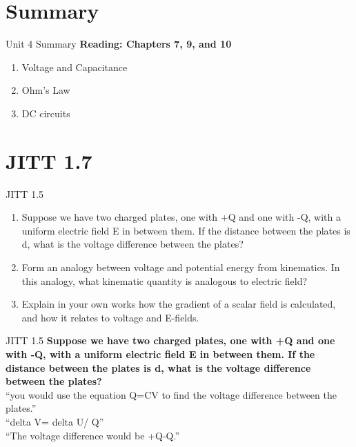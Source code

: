 \documentclass{beamer}
\begin{document}
\section{Summary}

\begin{frame}{Unit 4 Summary}
\textbf{Reading: Chapters 7, 9, and 10}
\begin{enumerate}
\item \alert{Voltage and Capacitance}
\item Ohm's Law
\item DC circuits
\end{enumerate}
\end{frame}

\section{JITT 1.7}

\begin{frame}{JITT 1.5}
\begin{enumerate}
\item Suppose we have two charged plates, one with +Q and one with -Q, with a uniform electric field E in between them.  If the distance between the plates is d, what is the voltage difference between the plates?
\item Form an analogy between voltage and potential energy from kinematics.  In this analogy, what kinematic quantity is analogous to electric field?
\item Explain in your own works how the \alert{gradient} of a \alert{scalar field} is calculated, and how it relates to voltage and E-fields.
\end{enumerate}
\end{frame}

\begin{frame}{JITT 1.5}
\textbf{Suppose we have two charged plates, one with +Q and one with -Q, with a uniform electric field E in between them.  If the distance between the plates is d, what is the voltage difference between the plates?} \\
``you would use the equation Q=CV to find the voltage difference between the plates.'' \\
``delta V= delta U/ Q'' \\
``The voltage difference would be +Q-Q.''
\end{frame}
\end{document}
